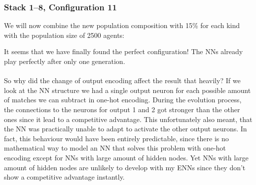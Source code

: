 \documentclass[11pt]{report}
\begin{document}
\begin{enumerate}
                \subsubsection{Stack 1--8, Configuration 11}
    We will now combine the new population composition with 15\% for each kind with the population size of 2500 agents:
    \\
    \renewcommand{\csvpath}{../data/simple_nim/stack_8r/t_11/stats.csv} %
    \begin{center}
    \end{center}
    It seems that we have finally found the perfect configuration!
    The NNs already play perfectly after only one generation.
    \\ \\
    So why did the change of output encoding affect the result that heavily?
    If we look at the NN structure we had a single output neuron for each possible amount of matches we can subtract in one-hot encoding.
    During the evolution process, the connections to the neurons for output 1 and 2 got stronger than the other ones since it lead to a competitive advantage.
    This unfortunately also meant, that the NN was practically unable to adapt to activate the other output neurons.
    In fact, this behaviour would have been entirely predictable, since there is no mathematical way to model an NN that solves this problem with one-hot encoding except for NNs with large amount of hidden nodes.
    Yet NNs with large amount of hidden nodes are unlikely to develop with my ENNs since they don't show a competitive advantage instantly.


\end{enumerate}
\end{document}
